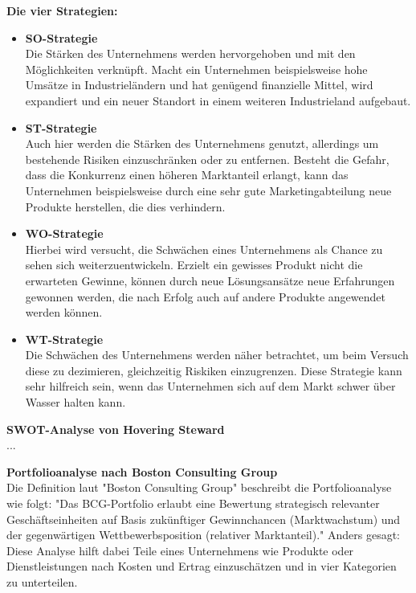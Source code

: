   \textbf{Die vier Strategien:}\\
  \begin{itemize}
    \item \textbf{SO-Strategie}\\
    Die Stärken des Unternehmens werden hervorgehoben und mit den Möglichkeiten verknüpft. Macht ein Unternehmen beispielsweise hohe Umsätze in Industrieländern und hat
    genügend finanzielle Mittel, wird expandiert und ein neuer Standort in einem weiteren Industrieland aufgebaut.

    \item \textbf{ST-Strategie}\\
    Auch hier werden die Stärken des Unternehmens genutzt, allerdings um bestehende Risiken einzuschränken oder zu entfernen. Besteht die Gefahr, dass die Konkurrenz
    einen höheren Marktanteil erlangt, kann das Unternehmen beispielsweise durch eine sehr gute Marketingabteilung neue Produkte herstellen, die dies verhindern.

    \item \textbf{WO-Strategie}\\
    Hierbei wird versucht, die Schwächen eines Unternehmens als Chance zu sehen sich weiterzuentwickeln. Erzielt ein gewisses Produkt nicht die erwarteten Gewinne,
    können durch neue Lösungsansätze neue Erfahrungen gewonnen werden, die nach Erfolg auch auf andere Produkte angewendet werden können.

    \item \textbf{WT-Strategie}\\
    Die Schwächen des Unternehmens werden näher betrachtet, um beim Versuch diese zu dezimieren, gleichzeitig Riskiken einzugrenzen. Diese Strategie kann sehr hilfreich
    sein, wenn das Unternehmen sich auf dem Markt schwer über Wasser halten kann.
  \end{itemize}
  \textbf{SWOT-Analyse von Hovering Steward}\\
  ...

  \textbf{Portfolioanalyse nach Boston Consulting Group}\\
  Die Definition laut {"Boston Consulting Group"\cite{portfolioanalyse}} beschreibt die Portfolioanalyse wie folgt:
  "Das BCG-Portfolio erlaubt eine Bewertung strategisch relevanter Geschäftseinheiten auf Basis zukünftiger Gewinnchancen (Marktwachstum) und der
  gegenwärtigen Wettbewerbsposition (relativer Marktanteil)." Anders gesagt: Diese Analyse hilft dabei Teile eines Unternehmens wie Produkte oder Dienstleistungen
  nach Kosten und Ertrag einzuschätzen und in vier Kategorien zu unterteilen.

